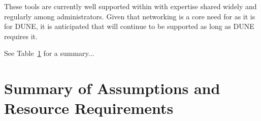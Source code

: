 \documentclass[../main-v1.tex]{subfiles}
\begin{document}
These tools are currently well supported within  with %
expertise shared widely and regularly among administrators.
Given %
that networking is a core need for  as it is for DUNE, it is anticipated that  %
will continue to be supported %
as long as DUNE requires it.

See Table~\ref{}  for a summary... 











\section{Summary of Assumptions and Resource Requirements}

%
\end{document}
